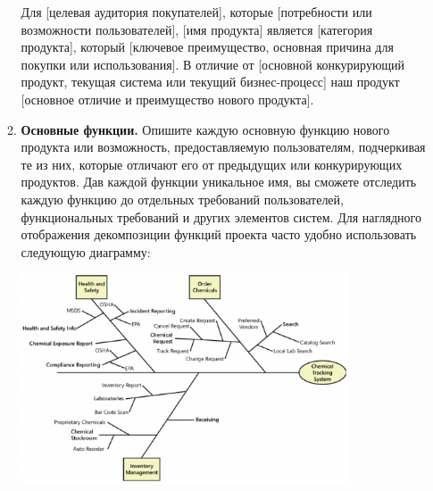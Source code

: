 \documentclass{../../text-style}
\begin{document}
\begin{enumerate}
\begin{enumerate}
        Для [целевая аудитория покупателей], которые [потребности или возможности пользователей], [имя продукта]  является [категория продукта], который [ключевое преимущество, основная причина для покупки или использования]. В отличие от [основной конкурирующий продукт, текущая система или текущий бизнес-процесс] наш продукт [основное отличие и преимущество нового продукта].
        \item \textbf{Основные функции.} Опишите каждую основную функцию нового продукта или возможность, предоставляемую пользователям, подчеркивая те из них, которые отличают его от предыдущих или конкурирующих продуктов. Дав каждой функции уникальное имя, вы сможете отследить каждую функцию до отдельных требований пользователей, функциональных требований и других элементов систем. Для наглядного отображения декомпозиции функций проекта часто удобно использовать следующую диаграмму:
        \begin{center}
            \includegraphics[width=0.8\textwidth]{featureTree.png}
        \end{center}


\end{enumerate}
\end{enumerate}
\end{document}
